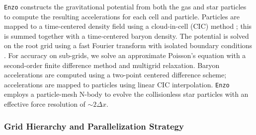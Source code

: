 \documentclass[11pt]{article}
\begin{document}
\texttt{Enzo} constructs the gravitational potential from both the gas and star particles to compute the resulting accelerations for each cell and particle. Particles are mapped to a time-centered density field using a cloud-in-cell (CIC) method \citep{HockneyEastwood1988}; this is summed together with a time-centered baryon density. The potential is solved on the root grid using a fast Fourier transform with isolated boundary conditions \citep{James1977}. For accuracy on sub-grids, we solve an approximate Poisson's equation with a second-order finite difference method and multigrid relaxation. Baryon accelerations are computed using a two-point centered difference scheme; accelerations are mapped to particles using linear CIC interpolation. \texttt{Enzo} employs a particle-mesh N-body to evolve the collisionless star particles with an effective force resolution of $\sim 2 \Delta x$.

\subsubsection{Grid Hierarchy and Parallelization Strategy}

\end{document}
